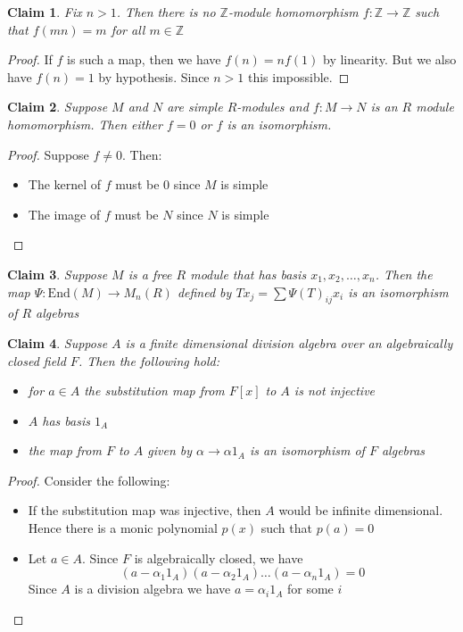 \documentclass[a4paper,11pt]{article}
\newtheorem{claim}{Claim}
\begin{document}
\begin{claim}
  Fix $n>1$. Then there is no $\mathbb{Z}$-module homomorphism $f:\mathbb{Z} \to \mathbb{Z}$ such that $f(mn)=m$ for all $m \in \mathbb{Z}$
\end{claim}

\begin{proof}
  If $f$ is such a map, then we have $f(n)=nf(1)$ by linearity. But we also have $f(n)=1$ by hypothesis. Since $n>1$ this impossible.
\end{proof}

\begin{claim}
  Suppose $M$ and $N$ are simple $R$-modules and $f:M \to N$ is an $R$ module homomorphism. Then either $f=0$ or $f$ is an isomorphism.
\end{claim}

\begin{proof}
  Suppose $f \neq 0$. Then:
  \begin{itemize}
    \item The kernel of $f$ must be $0$ since $M$ is simple
    \item The image of $f$ must be $N$ since $N$ is simple
  \end{itemize}
\end{proof}

\begin{claim}
  Suppose $M$ is a free $R$ module that has basis $x_1,x_2,\dots,x_n$. Then the map $\Psi:\text{End}(M) \to M_n(R)$ defined by $Tx_j = \sum \Psi(T)_{ij}x_i$ is an isomorphism of $R$ algebras
\end{claim}

\begin{claim}
  Suppose $A$ is a finite dimensional division algebra over an algebraically closed field $F$.
  Then the following hold:
  \begin{itemize}
    \item for $a \in A$ the substitution map from $F[x]$ to $A$ is not injective
    \item $A$ has basis $1_A$ 
    \item the map from $F$ to $A$ given by $\alpha \to \alpha 1_A$ is an isomorphism of $F$ algebras 
  \end{itemize}
\end{claim}

\begin{proof}
  Consider the following:
  \begin{itemize}
    \item If the substitution map was injective, then $A$ would be infinite dimensional. Hence there is a monic polynomial $p(x)$ such that $p(a)=0$
    \item Let $a \in A$. Since $F$ is algebraically closed, we have \[(a-\alpha_1 1_A)(a-\alpha_2 1_A)\dots(a-\alpha_n 1_A)=0\]
    Since $A$ is a division algebra we have $a=\alpha_i 1_A$ for some $i$
  \end{itemize}
\end{proof}
\end{document}
